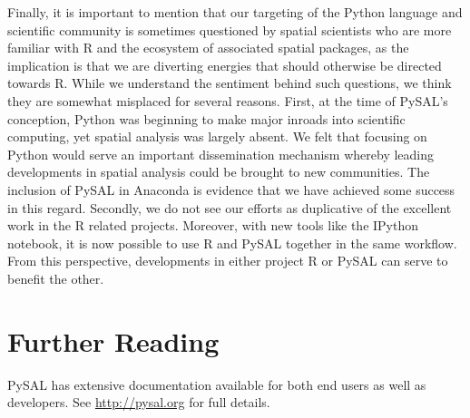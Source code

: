 \documentclass[11pt, titlepage]{amsart}
\begin{document}
Finally, it is important to mention that our targeting of the Python
language and scientific community is sometimes questioned by spatial
scientists who are more familiar with R and the ecosystem of associated
spatial packages, as the implication is that we are diverting energies
that should otherwise be directed towards R. While we understand the
sentiment behind such questions, we think they are somewhat misplaced
for several reasons. First, at the time of PySAL's conception, Python
was beginning to make major inroads into scientific computing, yet
spatial analysis was largely absent. We felt that focusing on Python
would serve an important dissemination mechanism whereby leading
developments in spatial analysis could be brought to new communities.
The inclusion of PySAL in Anaconda is evidence that we have achieved
some success in this regard. Secondly, we do not see our efforts as
duplicative of the excellent work in the R related projects.  Moreover,
with new tools like the IPython notebook, it is now possible to use R
and PySAL together in the same workflow. From this perspective,
developments in either project R or PySAL can serve to benefit the
other.


%


\section*{Further Reading}

PySAL has extensive documentation available for both end users as well
as developers. See \url{http://pysal.org} for full details.

\end{document}
